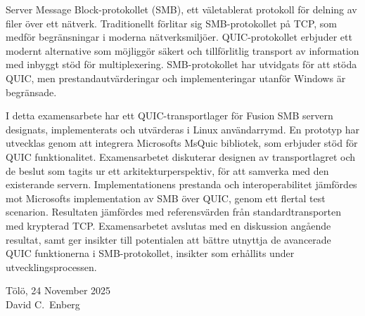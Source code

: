 \documentclass[english, 12pt, a4paper, elec, utf8, a-2b, online]{aaltothesis}
\begin{document}
\newpage

\begin{abstractpage}[swedish]
	Server Message Block-protokollet (SMB), ett väletablerat protokoll för
	delning av filer över ett nätverk. Traditionellt förlitar sig SMB-protokollet
	på TCP, som medför begränsningar i moderna nätverksmiljöer. QUIC-protokollet
	erbjuder ett modernt alternative som möjliggör säkert och tillförlitlig
	transport av information med inbyggt stöd för multiplexering. SMB-protokollet
	har utvidgats för att stöda QUIC, men prestandautvärderingar och implementeringar
	utanför Windows är begränsade.

	I detta examensarbete har ett QUIC-transportlager för Fusion SMB servern designats,
	implementerats och utvärderas i Linux användarrymd. En prototyp har utvecklas genom
	att integrera Microsofts MsQuic bibliotek, som erbjuder stöd för QUIC funktionalitet.
	Examensarbetet diskuterar designen av transportlagret och de beslut som tagits
	ur ett arkitekturperspektiv, för att samverka med den existerande servern. Implementationens
	prestanda och interoperabilitet jämfördes mot Microsofts implementation av SMB över QUIC,
	genom ett flertal test scenarion. Resultaten jämfördes med referensvärden från
	standardtransporten med krypterad TCP. Examensarbetet avslutas med en diskussion
	angående resultat, samt ger insikter till potentialen att bättre utnyttja de avancerade
	QUIC funktionerna i SMB-protokollet, insikter som erhållits under utvecklingsprocessen.
\end{abstractpage}


\dothesispagenumbering{}


\vspace{5cm}
Tölö, 24 November 2025\\

\vspace{5mm}
{\hfill David C.\ Enberg \hspace{1cm}}
\end{document}
